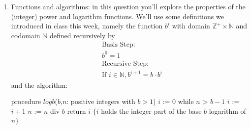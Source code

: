 \documentclass[12pt, oneside]{article}
\begin{document}
\begin{enumerate}[labelindent=0pt, leftmargin=0pt]
\item Functions and algorithms: in this question you'll explore the properties of the (integer) power and logarithm
functions. We'll use some definitions we introduced in class this week, namely the function
$b^i$ with domain $\mathbb{Z}^+ \times \mathbb{N}$ and codomain $\mathbb{N}$ defined recursively by
\begin{align*}    
&\textrm{Basis Step:} \\
&b^0 = 1 \\
&\textrm{Recursive Step:}\\
&\textrm{If } i \in \mathbb{N}, b^{i+1} = b \cdot b^i
\end{align*}
and the algorithm:


\begin{algorithm}[caption={Calculating integer part of base $b$ logarithm}]
   procedure $logb$($b$,$n$: positive integers with $b > 1$)
   $i$ := $0$
   while $n$ > $b-1$
     $i$ := $i + 1$
     $n$ := $n$ div $b$
   return $i$ $\{ i$ holds the integer part of the base $b$ logarithm of $n\}$
\end{algorithm} 


\end{enumerate}
\end{document}
